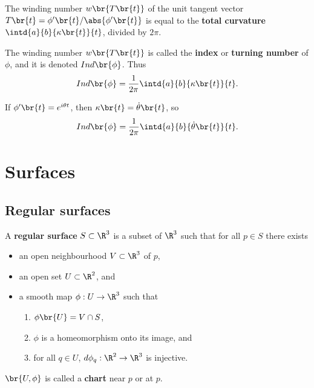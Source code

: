 \begin{proposition}
The winding number $ w\br{T\br{t}} $ of the unit tangent vector $ T\br{t} = \phi'\br{t} / \abs{\phi'\br{t}} $ is equal to the \textbf{total curvature} $ \intd{a}{b}{\kappa\br{t}}{t} $, divided by $ 2\pi $.
\end{proposition}

\begin{definition}
The winding number $ w\br{T\br{t}} $ is called the \textbf{index} or \textbf{turning number} of $ \phi $, and it is denoted $ Ind\br{\phi} $. Thus
$$ Ind\br{\phi} = \dfrac{1}{2\pi}\intd{a}{b}{\kappa\br{t}}{t}. $$
\end{definition}

If $ \phi'\br{t} = e^{i\theta t} $, then $ \kappa\br{t} = \dot{\theta}\br{t} $, so
$$ Ind\br{\phi} = \dfrac{1}{2\pi}\intd{a}{b}{\dot{\theta}\br{t}}{t}. $$

\pagebreak

\section{Surfaces}


\subsection{Regular surfaces}

\begin{definition}
A \textbf{regular surface} $ S \subset \R^3 $ is a subset of $ \R^3 $ such that for all $ p \in S $ there exists
\begin{itemize}
\item an open neighbourhood $ V \subset \R^3 $ of $ p $,
\item an open set $ U \subset \R^2 $, and
\item a smooth map $ \phi : U \to \R^3 $ such that
\begin{enumerate}
\item $ \phi\br{U} = V \cap S $,
\item $ \phi $ is a homeomorphism onto its image, and
\item for all $ q \in U $, $ d\phi_q : \R^2 \to \R^3 $ is injective.
\end{enumerate}
\end{itemize}
$ \br{U, \phi} $ is called a \textbf{chart} near $ p $ or at $ p $.
\end{definition}

